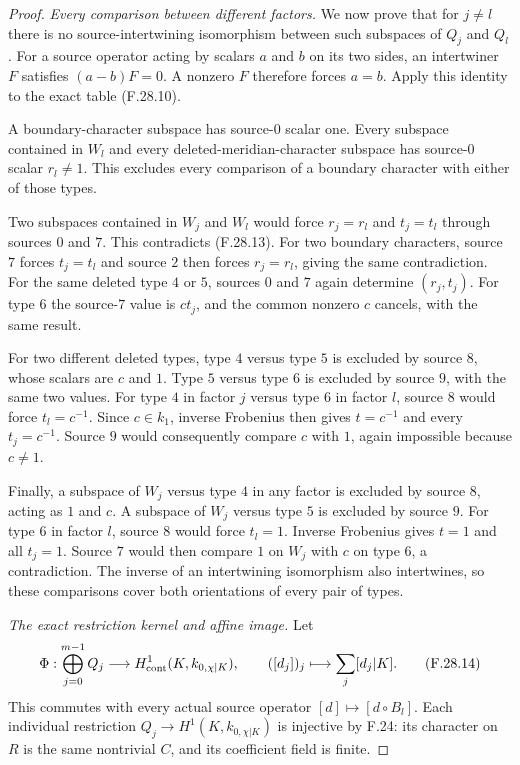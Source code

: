 \begin{proof}
\emph{Every comparison between different factors.}
We now prove that for $j\ne l$ there is no
source-intertwining isomorphism between such
subspaces of $Q_j$ and $Q_l$.
For a source operator acting by scalars $a$ and
$b$ on its two sides, an intertwiner $F$ satisfies
$(a-b)F=0$. A nonzero $F$ therefore forces $a=b$.
Apply this identity to the exact table (F.28.10).

A boundary-character subspace has source-$0$
scalar one. Every subspace contained in $W_l$
and every deleted-meridian-character subspace
has source-$0$ scalar $r_l\ne1$. This excludes
every comparison of a boundary character with
either of those types.

Two subspaces contained in $W_j$ and $W_l$
would force $r_j=r_l$ and $t_j=t_l$ through
sources $0$ and $7$. This contradicts (F.28.13).
For two boundary characters, source $7$ forces
$t_j=t_l$ and source $2$ then forces $r_j=r_l$,
giving the same contradiction. For the same
deleted type $4$ or $5$, sources $0$ and $7$
again determine $(r_j,t_j)$. For type $6$ the
source-$7$ value is $ct_j$, and the common
nonzero $c$ cancels, with the same result.

For two different deleted types, type $4$ versus
type $5$ is excluded by source $8$, whose scalars
are $c$ and $1$. Type $5$ versus type $6$ is
excluded by source $9$, with the same two values.
For type $4$ in factor $j$ versus type $6$ in
factor $l$, source $8$ would force
$t_l=c^{-1}$. Since $c\in k_1$, inverse Frobenius
then gives $t=c^{-1}$ and every $t_j=c^{-1}$.
Source $9$ would consequently compare $c$ with
$1$, again impossible because $c\ne1$.

Finally, a subspace of $W_j$ versus type $4$
in any factor is excluded by source $8$, acting
as $1$ and $c$. A subspace of $W_j$ versus
type $5$ is excluded by source $9$.
For type $6$ in factor $l$, source $8$ would
force $t_l=1$. Inverse Frobenius gives $t=1$
and all $t_j=1$. Source $7$ would then compare
$1$ on $W_j$ with $c$ on type $6$, a contradiction.
The inverse of an intertwining isomorphism
also intertwines, so these comparisons cover
both orientations of every pair of types.

\emph{The exact restriction kernel and affine image.}
Let
\[
 \Phi:\bigoplus_{j=0}^{m-1}Q_j
        \longrightarrow H^1_{\rm cont}(K,k_{0,\chi|K}),
        \qquad ([d_j])_j\longmapsto\sum_j[d_j|K].
                                                               \tag{F.28.14}
\]
This commutes with every actual source operator
$[d]\mapsto[d\circ B_l]$.
Each individual restriction $Q_j\to H^1(K,k_{0,\chi|K})$
is injective by F.24: its character on $R$ is
the same nontrivial $C$, and its coefficient
field is finite.


\end{proof}
